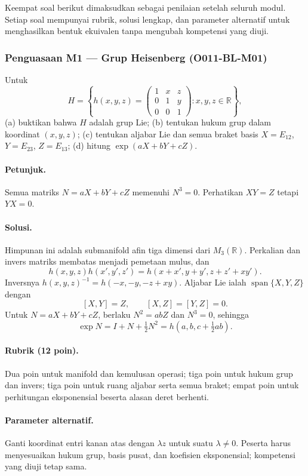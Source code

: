 Keempat soal berikut dimaksudkan sebagai penilaian setelah seluruh modul.
Setiap soal mempunyai rubrik, solusi lengkap, dan parameter alternatif untuk
menghasilkan bentuk ekuivalen tanpa mengubah kompetensi yang diuji.

\subsubsection*{Penguasaan M1 — Grup Heisenberg (O011-BL-M01)}
\label{o011-bl-m01}

Untuk
\[
 H=\left\{h(x,y,z)=
 \begin{pmatrix}1&x&z\\0&1&y\\0&0&1\end{pmatrix}:x,y,z\in\mathbb R\right\},
\]
(a) buktikan bahwa $H$ adalah grup Lie; (b) tentukan hukum grup dalam
koordinat $(x,y,z)$; (c) tentukan aljabar Lie dan semua braket basis
$X=E_{12}$, $Y=E_{23}$, $Z=E_{13}$; (d) hitung
$\exp(aX+bY+cZ)$.

\paragraph{Petunjuk.}
Semua matriks $N=aX+bY+cZ$ memenuhi $N^3=0$. Perhatikan $XY=Z$ tetapi
$YX=0$.

\paragraph{Solusi.}
Himpunan ini adalah submanifold afin tiga dimensi dari $M_3(\mathbb R)$.
Perkalian dan invers matriks membatas menjadi pemetaan mulus, dan
\[
 h(x,y,z)h(x',y',z')
 =h(x+x',y+y',z+z'+xy').
\]
Inversnya $h(x,y,z)^{-1}=h(-x,-y,-z+xy)$. Aljabar Lie ialah
$\operatorname{span}\{X,Y,Z\}$ dengan
\[
 [X,Y]=Z,
 \qquad [X,Z]=[Y,Z]=0.
\]
Untuk $N=aX+bY+cZ$, berlaku $N^2=abZ$ dan $N^3=0$, sehingga
\[
 \exp N=I+N+\tfrac12N^2
 =h\left(a,b,c+\tfrac12ab\right).
\]

\paragraph{Rubrik (12 poin).}
Dua poin untuk manifold dan kemulusan operasi; tiga poin untuk hukum grup dan
invers; tiga poin untuk ruang aljabar serta semua braket; empat poin untuk
perhitungan eksponensial beserta alasan deret berhenti.

\paragraph{Parameter alternatif.}
Ganti koordinat entri kanan atas dengan $\lambda z$ untuk suatu
$\lambda\ne0$. Peserta harus menyesuaikan hukum grup, basis pusat, dan
koefisien eksponensial; kompetensi yang diuji tetap sama.

